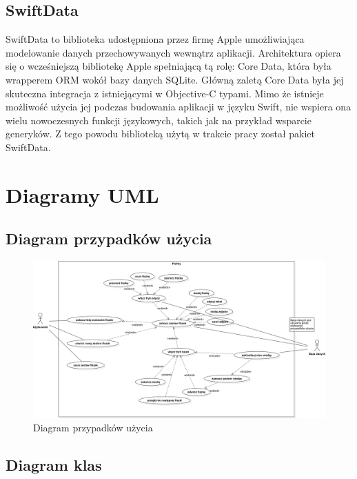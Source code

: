 \documentclass[final,a4paper,openany,12pt]{mwbk}
\begin{document}
\section{SwiftData}

SwiftData to biblioteka udostępniona przez firmę Apple umożliwiająca modelowanie danych przechowywanych wewnątrz aplikacji. Architektura opiera się o wcześniejszą bibliotekę Apple spełniającą tą rolę: Core Data, która była wrapperem ORM wokół bazy danych SQLite. Główną zaletą Core Data była jej skuteczna integracja z istniejącymi w Objective-C typami. Mimo że istnieje możliwość użycia jej podczas budowania aplikacji w języku Swift, nie wspiera ona wielu nowoczesnych funkcji językowych, takich jak na przykład wsparcie generyków. Z tego powodu biblioteką użytą w trakcie pracy został pakiet SwiftData.


\chapter{Diagramy UML}

\section{Diagram przypadków użycia}

\begin{figure}[h]
    \centering
    \includegraphics[width=1.0\textwidth]{img/UseCaseDiagram1.png}
    \caption{Diagram przypadków użycia}
    \label{fig:UseCaseDiagram1}
\end{figure}

\section{Diagram klas}
\end{document}
